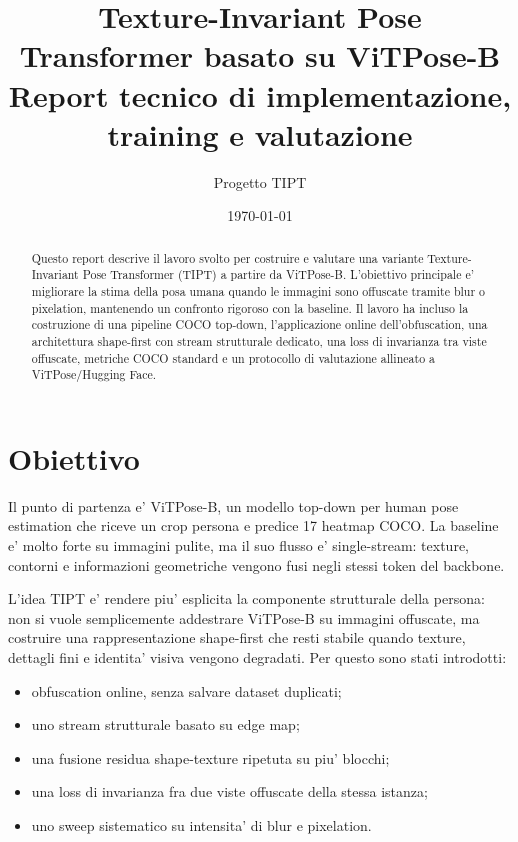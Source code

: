 \documentclass[11pt,a4paper]{article}
\title{\textbf{Texture-Invariant Pose Transformer basato su ViTPose-B}\\
\large Report tecnico di implementazione, training e valutazione}
\author{Progetto TIPT}
\date{\today}
\newcommand{\vitpose}{ViTPose-B}
\begin{document}
\maketitle

\begin{abstract}
Questo report descrive il lavoro svolto per costruire e valutare una variante
Texture-Invariant Pose Transformer (TIPT) a partire da \vitpose. L'obiettivo
principale e' migliorare la stima della posa umana quando le immagini sono
offuscate tramite blur o pixelation, mantenendo un confronto rigoroso con la
baseline. Il lavoro ha incluso la costruzione di una pipeline COCO top-down,
l'applicazione online dell'obfuscation, una architettura shape-first con stream
strutturale dedicato, una loss di invarianza tra viste offuscate, metriche COCO
standard e un protocollo di valutazione allineato a ViTPose/Hugging Face.
\end{abstract}

\section{Obiettivo}

Il punto di partenza e' \vitpose, un modello top-down per human pose estimation
che riceve un crop persona e predice 17 heatmap COCO. La baseline e' molto forte
su immagini pulite, ma il suo flusso e' single-stream: texture, contorni e
informazioni geometriche vengono fusi negli stessi token del backbone.

L'idea TIPT e' rendere piu' esplicita la componente strutturale della persona:
non si vuole semplicemente addestrare \vitpose{} su immagini offuscate, ma
costruire una rappresentazione shape-first che resti stabile quando texture,
dettagli fini e identita' visiva vengono degradati. Per questo sono stati
introdotti:

\begin{itemize}[leftmargin=1.2em]
  \item obfuscation online, senza salvare dataset duplicati;
  \item uno stream strutturale basato su edge map;
  \item una fusione residua shape-texture ripetuta su piu' blocchi;
  \item una loss di invarianza fra due viste offuscate della stessa istanza;
  \item uno sweep sistematico su intensita' di blur e pixelation.
\end{itemize}
\end{document}
